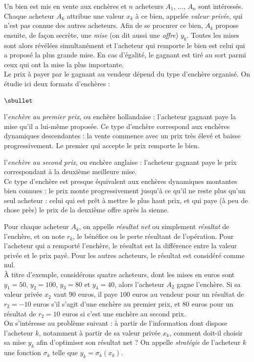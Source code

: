 \documentclass[11pt]{article}%
\begin{document}
\noindent
Un bien est mis en vente aux enchères et $n$ acheteurs $A_1$, $\ldots$,
$A_n$ sont intéressés. Chaque acheteur $A_k$ attribue une valeur $x_k$ 
à ce bien, appelée \emph{valeur privée}, qui n'est pas connue des 
autres acheteurs. Afin de se procurer ce bien, $A_k$ propose ensuite, 
de façon secrète, une \emph{mise} (on dit aussi une \emph{offre}) 
$y_k$. Toutes les mises sont alors révélées simultanément et l'acheteur 
qui remporte le bien est celui qui a proposé la plus grande mise. En 
cas d'égalité, le gagnant est tiré au sort parmi ceux qui ont la mise 
la plus importante.\\
Le prix à payer par le gagnant au vendeur dépend du type d'enchère 
organisé. On étudie ici deux formats d'enchères :
\begin{noliste}{$\sbullet$}
  \item l'\emph{enchère au premier prix}, ou enchère hollandaise : 
  l'acheteur gagnant paye la mise qu'il a lui-même proposée. Ce type 
  d'enchère correspond aux enchères dynamiques \og descendantes \fg{} :
  la vente commence avec un prix très élevé et baisse progressivement.
  Le premier qui accepte le prix remporte le bien.
  
  \item l'\emph{enchère au second prix}, ou enchère anglaise : 
  l'acheteur gagnant paye le prix correspondant à la deuxième meilleure
  mise.\\
  Ce type d'enchère est presque équivalent aux enchères dynamiques \og
  montantes \fg{} bien connues : le prix monte progressivement 
  jusqu'à ce qu'il ne reste plus qu'un seul acheteur : celui qui est 
  prêt à mettre le plus haut prix, et qui paye (à peu de chose près) le
  prix de la deuxième offre après la sienne.
\end{noliste}
Pour chaque acheteur $A_k$, on appelle \emph{résultat net} ou 
simplement \emph{résultat} de l'enchère, et on note $r_k$, le bénéfice 
ou le perte résultant de l'opération. Pour l'acheteur qui a remporté 
l'enchère, le résultat est la différence entre la valeur privée et le 
prix payé. Pour les autres acheteurs, le résultat est considéré comme 
nul.\\
À titre d'exemple, considérons quatre acheteurs, dont les mises en 
euros sont $y_1=50$, $y_2=100$, $y_3=80$ et $y_4=40$, alors l'acheteur 
$A_2$ gagne l'enchère. Si sa valeur privée $x_2$ vaut $90$ euros, il 
paye $100$ euros au vendeur pour un résultat de $r_2=-10$ euros s'il 
s'agit d'une enchère au premier prix, et $80$ euros pour un résultat de 
$r_2=10$ euros si c'est une enchère au second prix.\\
On s'intéresse au problème suivant : à partir de l'information dont 
dispose l'acheteur $k$, notamment à partir de sa valeur privée $x_k$, 
comment doit-il choisir sa mise $y_k$ afin d'optimiser son résultat net 
? On appelle \emph{stratégie} de l'acheteur $k$ une fonction $\sigma_k$ 
telle que $y_k = \sigma_k(x_k)$.
\end{document}

